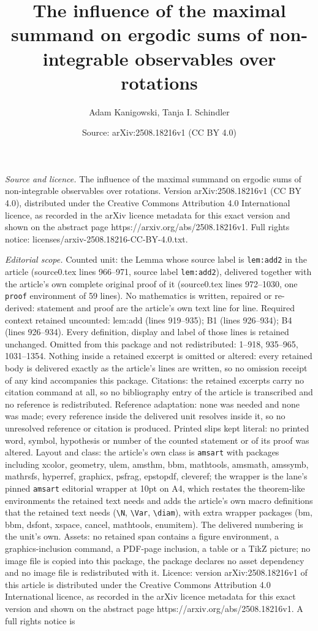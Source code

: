 \documentclass[10pt,a4paper]{amsart}
\title[The influence of the maximal summand on ergodic sums of non-]{The influence of the maximal summand on ergodic sums of non-integrable observables over rotations}
\author{Adam Kanigowski, Tanja I. Schindler}
\date{Source: arXiv:2508.18216v1 (CC BY 4.0)}
\begin{document}
\maketitle

\noindent\emph{Source and licence.} The influence of the maximal summand on ergodic sums of non-integrable observables over rotations. Version arXiv:2508.18216v1 (CC BY 4.0), distributed under the Creative Commons Attribution 4.0 International licence, as recorded in the arXiv licence metadata for this exact version and shown on the abstract page https://arxiv.org/abs/2508.18216v1. Full rights notice: licenses/arxiv-2508.18216-CC-BY-4.0.txt.\par\smallskip

\noindent\textit{Editorial scope.} Counted unit: the Lemma whose source label is \texttt{lem:add2} in the article (source0.tex lines 966--971, source label \texttt{lem:add2}), delivered together with the article's own complete original proof of it (source0.tex lines 972--1030, one \texttt{proof} environment of 59 lines). No mathematics is written, repaired or re-derived: statement and proof are the article's own text line for line. Required context retained uncounted: lem:add (lines 919--935); B1 (lines 926--934); B4 (lines 926--934). Every definition, display and label of those lines is retained unchanged. Omitted from this package and not redistributed: 1--918, 935--965, 1031--1354. Nothing inside a retained excerpt is omitted or altered: every retained body is delivered exactly as the article's lines are written, so no omission receipt of any kind accompanies this package. Citations: the retained excerpts carry no citation command at all, so no bibliography entry of the article is transcribed and no reference is redistributed. Reference adaptation: none was needed and none was made; every reference inside the delivered unit resolves inside it, so no unresolved reference or citation is produced. Printed slips kept literal: no printed word, symbol, hypothesis or number of the counted statement or of its proof was altered. Layout and class: the article's own class is \texttt{amsart} with packages including xcolor, geometry, ulem, amsthm, bbm, mathtools, amsmath, amssymb, mathrsfs, hyperref, graphicx, psfrag, epstopdf, cleveref; the wrapper is the lane's pinned \texttt{amsart} editorial wrapper at 10pt on A4, which restates the theorem-like environments the retained text needs and adds the article's own macro definitions that the retained text needs (\texttt{\textbackslash N}, \texttt{\textbackslash Var}, \texttt{\textbackslash diam}), with extra wrapper packages (bm, bbm, dsfont, xspace, cancel, mathtools, enumitem). The delivered numbering is the unit's own. Assets: no retained span contains a figure environment, a graphics-inclusion command, a PDF-page inclusion, a table or a TikZ picture; no image file is copied into this package, the package declares no asset dependency and no image file is redistributed with it. Licence: version arXiv:2508.18216v1 of this article is distributed under the Creative Commons Attribution 4.0 International licence, as recorded in the arXiv licence metadata for this exact version and shown on the abstract page https://arxiv.org/abs/2508.18216v1. A full rights notice is 
\end{document}

